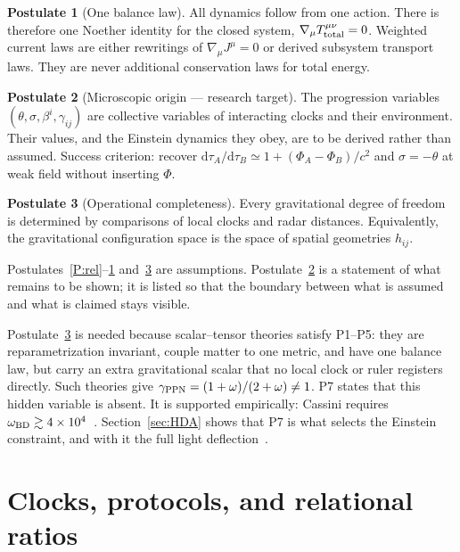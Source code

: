 \documentclass[11pt]{article}
\newcommand{\thP}{\theta}             %
\newcommand{\sgP}{\sigma}             %
\newcommand{\dd}{\mathrm{d}}
\theoremstyle{plain}
\theoremstyle{definition}
\newtheorem{postulate}{Postulate}
\theoremstyle{remark}
\begin{document}
\begin{postulate}[One balance law]\label{P:balance}
All dynamics follow from one action. There is therefore one Noether identity for the closed system, $\nabla_\mu T^{\mu\nu}_{\rm total}=0$. Weighted current laws are either rewritings of $\nabla_\mu J^\mu=0$ or derived subsystem transport laws. They are never additional conservation laws for total energy.
\end{postulate}

\begin{postulate}[Microscopic origin --- research target]\label{P:micro}
The progression variables $(\thP,\sgP,\beta^i,\gamma_{ij})$ are collective variables of interacting clocks and their environment. Their values, and the Einstein dynamics they obey, are to be derived rather than assumed. Success criterion: recover
$\dd\tau_A/\dd\tau_B \simeq 1+(\Phi_A-\Phi_B)/c^2$ and $\sgP=-\thP$ at weak field without inserting $\Phi$.
\end{postulate}

\begin{postulate}[Operational completeness]\label{P:OC}
Every gravitational degree of freedom is determined by comparisons of local clocks and radar distances. Equivalently, the gravitational configuration space is the space of spatial geometries $h_{ij}$.
\end{postulate}

Postulates~\ref{P:rel}--\ref{P:balance} and~\ref{P:OC} are assumptions. Postulate~\ref{P:micro} is a statement of what remains to be shown; it is listed so that the boundary between what is assumed and what is claimed stays visible.

Postulate~\ref{P:OC} is needed because scalar--tensor theories satisfy P1--P5: they are reparametrization invariant, couple matter to one metric, and have one balance law, but carry an extra gravitational scalar that no local clock or ruler registers directly. Such theories give $\gamma_{\rm PPN}=(1+\omega)/(2+\omega)\neq1$. P7 states that this hidden variable is absent. It is supported empirically: Cassini requires $\omega_{\rm BD}\gtrsim4\times10^4$~\cite{Bertotti2003,Will2014}. Section~\ref{sec:HDA} shows that P7 is what selects the Einstein constraint, and with it the full light deflection~\cite{JordanNote2}.

\section{Clocks, protocols, and relational ratios}
\label{sec:clocks}
\end{document}
